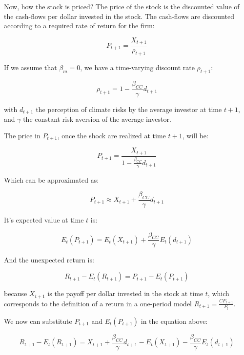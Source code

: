 Now, how the stock is priced? 
The price of the stock is the discounted value of the 
cash-flows per dollar invested in the stock.
The cash-flows are discounted according 
to a required rate of return for the firm:

\begin{equation}
    P_{t+1} = \frac{X_{t+1}}{\rho_{t+1}}
\end{equation}

If we assume that $\beta_m = 0$,
we have a time-varying discount rate $\rho_{t+1}$:

\begin{equation}
    \rho_{t+1} = 1 - \frac{\beta_{CC}}{\gamma} d_{t+1}
\end{equation}

with $d_{t+1}$ the perception of climate 
risks by the average investor at time $t+1$,
and $\gamma$ the constant risk aversion of 
the average investor.

The price in $P_{t+1}$, once 
the shock are realized at time $t+1$, will be:

\begin{equation}
    P_{t+1} = \frac{X_{t+1}}{1 - \frac{\beta_{CC}}{\gamma}d_{t+1}}
\end{equation}

Which can be approximated as:

\begin{equation}
    P_{t+1} \approx X_{t+1} + \frac{\beta_{CC}}{\gamma}d_{t+1}
\end{equation}

It's expected value at time $t$ is:

\begin{equation}
    E_t(P_{t+1}) = E_t(X_{t+1}) + \frac{\beta_{CC}}{\gamma}E_t(d_{t+1})
\end{equation}

And the unexpected return is:

\begin{equation}
    R_{t+1} - E_t(R_{t+1}) = P_{t+1} - E_t(P_{t+1})
\end{equation}

because $X_{t+1}$ is the payoff per dollar invested in the stock at time $t$,
which corresponds to the definition of a return in a 
one-period model $R_{t+1} = \frac{CF_{t+1}}{P_t}$.

We now can substitute $P_{t+1}$ and $E_t(P_{t+1})$ in the equation above:

\begin{equation}
    R_{t+1} - E_t(R_{t+1}) = X_{t+1} + \frac{\beta_{CC}}{\gamma}d_{t+1} - E_t(X_{t+1}) - \frac{\beta_{CC}}{\gamma}E_t(d_{t+1})
\end{equation}

